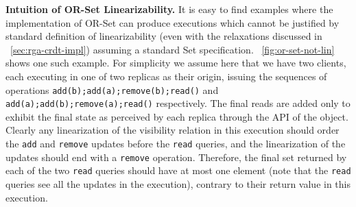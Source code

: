 


\smallskip
\noindent
{\bf Intuition of OR-Set Linearizability.}
It is easy to find examples where the implementation of OR-Set can
produce executions which cannot be justified by standard definition of
linearizability (even with the relaxations discussed in \sectionautorefname~\ref{sec:rga-crdt-impl})
assuming a standard Set specification.
%
\figureautorefname~\ref{fig:or-set-not-lin} shows one such example.
%
For simplicity we assume here that we have two clients, each executing
in one of two replicas as their origin, issuing the sequences of
operations \lstinline|add(b);add(a);remove(b);read()| and
\lstinline|add(a);add(b);remove(a);read()| respectively.
%
The final reads are added only to exhibit the final state as perceived by
each replica through the API of the object.
%
Clearly any linearization of the visibility relation in this execution should order
the \lstinline|add| and \lstinline|remove| updates before the \lstinline|read| queries,
and the linearization of the updates should end with a
\lstinline|remove| operation. 
Therefore, the final set returned by each of the two \lstinline|read| queries should have
at most one element (note that the \lstinline|read| queries see all the updates
in the execution), contrary to their return value in this execution.
%


